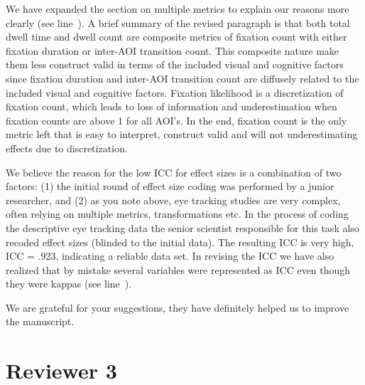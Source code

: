 
We have expanded the section on multiple metrics to explain our reasons more clearly (see line~). A brief summary of the revised paragraph is that both total dwell time and dwell count are composite metrics of fixation count with either fixation duration or inter-AOI transition count. This composite nature make them less construct valid in terms of the included visual and cognitive factors since fixation duration and inter-AOI transition count are diffusely related to the included visual and cognitive factors. Fixation likelihood is a discretization of fixation count, which leads to loss of information and underestimation when fixation counts are above 1 for all AOI's. In the end, fixation count is the only metric left that is easy to interpret, construct valid and will not underestimating effects due to discretization. 



We believe the reason for the low ICC for effect sizes is a combination of two factors: (1) the initial round of effect size coding was performed by a junior researcher, and (2) as you note above, eye tracking studies are very complex, often relying on multiple metrics, transformations etc. In the process of coding the descriptive eye tracking data the senior scientist responsible for this task also recoded effect sizes (blinded to the initial data). The resulting ICC is very high, ICC = .923, indicating a reliable data set. In revising the ICC we have also realized that by mistake several variables were represented as ICC even though they were kappas (see line~).



We are grateful for your suggestions, they have definitely helped us to improve the manuscript.




\section{Reviewer 3}
\label{rev:r3}

